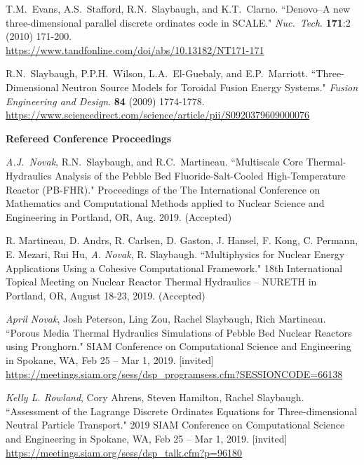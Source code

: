 \begin{bibsection}
\item T.M.\ Evans, A.S.\ Stafford, R.N.\ Slaybaugh, and K.T.\ Clarno. ``Denovo--A new three-dimensional parallel discrete ordinates code in SCALE." \textit{Nuc.\ Tech}. \textbf{171}:2 (2010) 171-200.\\
\url{https://www.tandfonline.com/doi/abs/10.13182/NT171-171}

\item R.N.\ Slaybaugh, P.P.H.\ Wilson, L.A.\ El-Guebaly, and E.P.\ Marriott. ``Three-Dimensional Neutron Source Models for Toroidal Fusion Energy Systems." \textit{Fusion Engineering and Design}. \textbf{84} (2009) 1774-1778.\\
\url{https://www.sciencedirect.com/science/article/pii/S0920379609000076} 

\item \textbf{Refereed Conference Proceedings}
\item \textit{A.J.\ Novak}, R.N.\ Slaybaugh, and R.C.\ Martineau. ``Multiscale Core Thermal-Hydraulics Analysis of the Pebble Bed Fluoride-Salt-Cooled High-Temperature Reactor (PB-FHR)." Proceedings of the The International Conference on Mathematics and Computational Methods applied to Nuclear Science and Engineering in Portland, OR, Aug. 2019. (Accepted) 

\item R. Martineau, D. Andrs, R. Carlsen, D. Gaston, J. Hansel, F. Kong, C. Permann, E. Mezari, Rui Hu, \textit{A. Novak}, R. Slaybaugh. ``Multiphysics for Nuclear Energy Applications Using a Cohesive Computational Framework." 18th International Topical Meeting on Nuclear Reactor Thermal Hydraulics – NURETH in Portland, OR, August 18-23, 2019. (Accepted)

\item \textit{April Novak}, Josh Peterson, Ling Zou, Rachel Slaybaugh, Rich Martineau. ``Porous Media Thermal Hydraulics Simulations of Pebble Bed Nuclear Reactors using Pronghorn." SIAM Conference on Computational Science and Engineering in Spokane, WA, Feb 25 – Mar 1, 2019. [invited]\\
\url{https://meetings.siam.org/sess/dsp_programsess.cfm?SESSIONCODE=66138}

\item \textit{Kelly L. Rowland}, Cory Ahrens, Steven Hamilton, Rachel Slaybaugh. ``Assessment of the Lagrange Discrete Ordinates Equations for Three-dimensional Neutral Particle Transport." 2019 SIAM Conference on Computational Science and Engineering in Spokane, WA, Feb 25 – Mar 1, 2019. [invited]\\
\url{https://meetings.siam.org/sess/dsp_talk.cfm?p=96180}


\end{bibsection}

